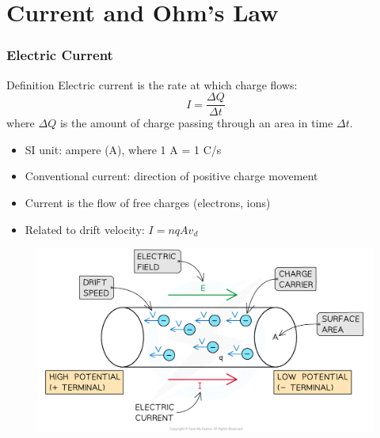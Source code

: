 \documentclass{beamer}
\begin{document}
\section{Current and Ohm's Law}
\begin{frame}
    \frametitle{Electric Current}
    \begin{block}{Definition}
        Electric current is the rate at which charge flows:
        \[ I = \frac{\Delta Q}{\Delta t} \]
        where $\Delta Q$ is the amount of charge passing through an area in time $\Delta t$.
    \end{block}
    \begin{itemize}
        \item SI unit: ampere (A), where 1 A = 1 C/s
        \item Conventional current: direction of positive charge movement
        \item Current is the flow of free charges (electrons, ions)
        \item Related to drift velocity: $I = nqAv_d$
    \end{itemize}
    \end{frame}
    \begin{frame}{}
    \begin{figure}
        \centering
        \includegraphics[width=1\linewidth]{5-1-2-charge-carriers-drifting-along-the-conductor_sl-physics-rn-3.png}
    \end{figure}
\end{frame}
\end{document}
